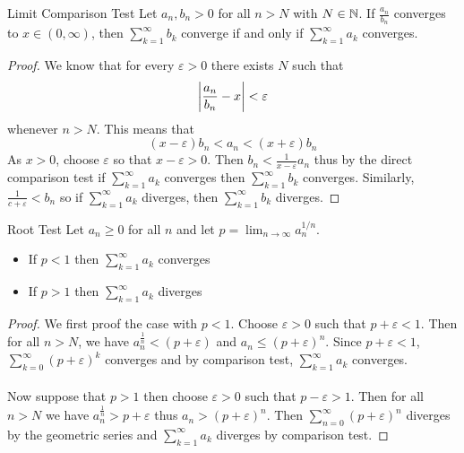 \documentclass[a4paper]{article}
\begin{document}
\begin{thm}{Limit Comparison Test}{} Let $a_n, b_n>0$ for all $n>N$ with $N\in\mathbb{N}$. If $\frac{a_n}{b_n}$ converges to $x\in(0,\infty)$, then $\sum_{k=1}^\infty b_k$ converge if and only if $\sum_{k=1}^\infty a_k$ converges. \tcbline
\begin{proof} We know that for every $\varepsilon>0$ there exists $N$ such that $$\abs{\frac{a_n}{b_n}-x}<\varepsilon$$ whenever $n>N$. This means that $$(x-\varepsilon)b_n<a_n<(x+\varepsilon)b_n$$ As $x>0$, choose $\varepsilon$ so that $x-\varepsilon>0$. Then $b_n<\frac{1}{x-\varepsilon}a_n$ thus by the direct comparison test if $\sum_{k=1}^\infty a_k$ converges then $\sum_{k=1}^\infty b_k$ converges. Similarly, $\frac{1}{c+\varepsilon}<b_n$ so if $\sum_{k=1}^\infty a_k$ diverges, then $\sum_{k=1}^\infty b_k$ diverges. 
\end{proof}
\end{thm}

\begin{thm}{Root Test}{} Let $a_n\geq0$ for all $n$ and let $p=\lim_{n\to\infty}a_n^{1/n}$. 
\begin{itemize}
\item If $p<1$ then $\sum_{k=1}^\infty a_k$ converges
\item If $p>1$ then $\sum_{k=1}^\infty a_k$ diverges
\end{itemize} \tcbline
\begin{proof} We first proof the case with $p<1$. Choose $\varepsilon>0$ such that $p+\varepsilon<1$. Then for all $n>N$, we have $a_n^\frac{1}{n}<(p+\varepsilon)$ and $a_n\leq(p+\varepsilon)^n$. Since $p+\varepsilon<1$, $\sum_{k=0}^{\infty}(p+\varepsilon)^k$ converges and by comparison test, $\sum_{k=1}^\infty a_k$ converges. \\~\\
Now suppose that $p>1$ then choose $\varepsilon>0$ such that $p-\varepsilon>1$. Then for all $n>N$ we have $a_n^\frac{1}{n}>p+\varepsilon$ thus $a_n>(p+\varepsilon)^n$. Then $\sum_{n=0}^{\infty}(p+\varepsilon)^n$ diverges by the geometric series and $\sum_{k=1}^\infty a_k$ diverges by comparison test. 
\end{proof}
\end{thm}
\end{document}
